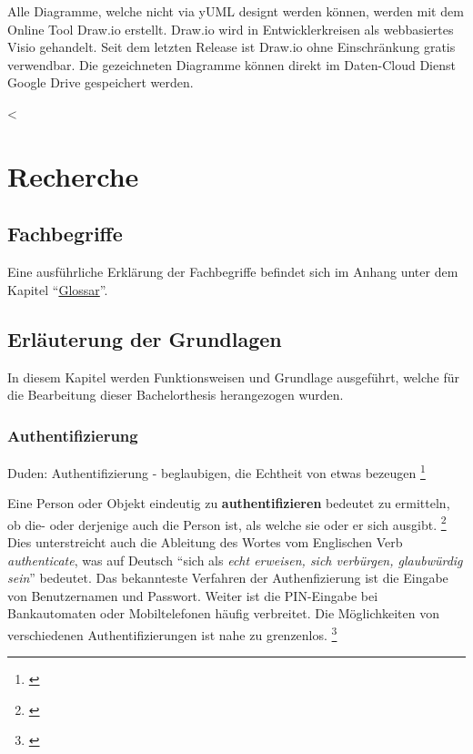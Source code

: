 Alle Diagramme, welche nicht via yUML designt werden können, werden mit
dem Online Tool Draw.io erstellt. Draw.io wird in Entwicklerkreisen als
webbasiertes Visio gehandelt. Seit dem letzten Release ist Draw.io ohne
Einschränkung gratis verwendbar. Die gezeichneten Diagramme können
direkt im Daten-Cloud Dienst Google Drive gespeichert werden.

\textless{}

\newpage

\chapter{Recherche}\label{recherche}

\section{Fachbegriffe}\label{fachbegriffe}

Eine ausführliche Erklärung der Fachbegriffe befindet sich im Anhang
unter dem Kapitel ``\protect\hyperlink{glossar}{Glossar}''.

\section{Erläuterung der
Grundlagen}\label{erluxe4uterung-der-grundlagen}

In diesem Kapitel werden Funktionsweisen und Grundlage ausgeführt,
welche für die Bearbeitung dieser Bachelorthesis herangezogen wurden.

\hypertarget{authentifizierung}{\subsection{Authentifizierung}\label{authentifizierung}}

Duden: Authentifizierung - beglaubigen, die Echtheit von etwas bezeugen
\footnote{\autocite{duden}}

Eine Person oder Objekt eindeutig zu \textbf{authentifizieren} bedeutet
zu ermitteln, ob die- oder derjenige auch die Person ist, als welche sie
oder er sich ausgibt. \footnote{\autocite{authentifizierungsdef}} Dies
unterstreicht auch die Ableitung des Wortes vom Englischen Verb
\emph{authenticate}, was auf Deutsch ``sich als \emph{echt erweisen,
sich verbürgen, glaubwürdig sein}'' bedeutet. Das bekannteste Verfahren
der Authenfizierung ist die Eingabe von Benutzernamen und Passwort.
Weiter ist die PIN-Eingabe bei Bankautomaten oder Mobiltelefonen häufig
verbreitet. Die Möglichkeiten von verschiedenen Authentifizierungen ist
nahe zu grenzenlos. \footnote{\autocite{authentifizierungsdeforg}}

